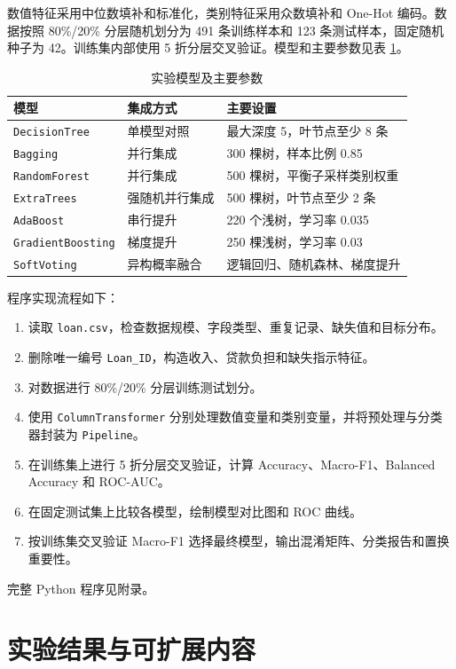 \documentclass[UTF8,a4paper,12pt]{ctexart}
\begin{document}
数值特征采用中位数填补和标准化，类别特征采用众数填补和 One-Hot 编码。数据按照 80\%/20\% 分层随机划分为 491 条训练样本和 123 条测试样本，固定随机种子为 42。训练集内部使用 5 折分层交叉验证。模型和主要参数见表 \ref{tab:models}。

\begin{table}[H]
\centering
\caption{实验模型及主要参数}
\label{tab:models}
\small
\begin{tabular}{lll}
\toprule
模型 & 集成方式 & 主要设置\\
\midrule
\texttt{DecisionTree} & 单模型对照 & 最大深度 5，叶节点至少 8 条\\
\texttt{Bagging} & 并行集成 & 300 棵树，样本比例 0.85\\
\texttt{RandomForest} & 并行集成 & 500 棵树，平衡子采样类别权重\\
\texttt{ExtraTrees} & 强随机并行集成 & 500 棵树，叶节点至少 2 条\\
\texttt{AdaBoost} & 串行提升 & 220 个浅树，学习率 0.035\\
\texttt{GradientBoosting} & 梯度提升 & 250 棵浅树，学习率 0.03\\
\texttt{SoftVoting} & 异构概率融合 & 逻辑回归、随机森林、梯度提升\\
\bottomrule
\end{tabular}
\end{table}

程序实现流程如下：
\begin{enumerate}
    \item 读取 \texttt{loan.csv}，检查数据规模、字段类型、重复记录、缺失值和目标分布。
    \item 删除唯一编号 \texttt{Loan\_ID}，构造收入、贷款负担和缺失指示特征。
    \item 对数据进行 80\%/20\% 分层训练测试划分。
    \item 使用 \texttt{ColumnTransformer} 分别处理数值变量和类别变量，并将预处理与分类器封装为 \texttt{Pipeline}。
    \item 在训练集上进行 5 折分层交叉验证，计算 Accuracy、Macro-F1、Balanced Accuracy 和 ROC-AUC。
    \item 在固定测试集上比较各模型，绘制模型对比图和 ROC 曲线。
    \item 按训练集交叉验证 Macro-F1 选择最终模型，输出混淆矩阵、分类报告和置换重要性。
\end{enumerate}

完整 Python 程序见附录。

\section{实验结果与可扩展内容}
\end{document}
